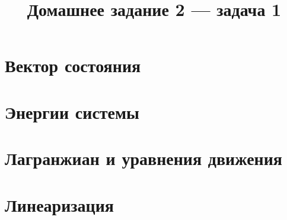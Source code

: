\documentclass{article}
\title{Домашнее задание 2 — задача 1}
\author{}
\date{}
\begin{document}
\maketitle

\section*{Вектор состояния}

\section*{Энергии системы}

\section*{Лагранжиан и уравнения движения}

\section*{Линеаризация}
\end{document}
